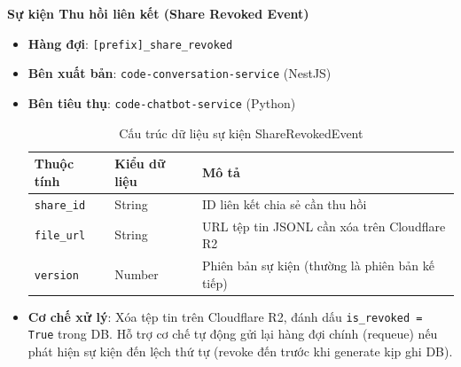 \textbf{Sự kiện Thu hồi liên kết (Share Revoked Event)}
\begin{itemize}
\item \textbf{Hàng đợi}: \texttt{[prefix]\_share\_revoked}
\item \textbf{Bên xuất bản}: \texttt{code-conversation-service} (NestJS)
\item \textbf{Bên tiêu thụ}: \texttt{code-chatbot-service} (Python)

\begin{table}[H]
\centering
\begin{tabular}{|l|l|l|}
\hline
\textbf{Thuộc tính} & \textbf{Kiểu dữ liệu} & \textbf{Mô tả} \\ \hline
\texttt{share\_id} & String & ID liên kết chia sẻ cần thu hồi \\ \hline
\texttt{file\_url} & String & URL tệp tin JSONL cần xóa trên Cloudflare R2 \\ \hline
\texttt{version} & Number & Phiên bản sự kiện (thường là phiên bản kế tiếp) \\ \hline
\end{tabular}
\caption{Cấu trúc dữ liệu sự kiện ShareRevokedEvent}
\end{table}

\item \textbf{Cơ chế xử lý}: Xóa tệp tin trên Cloudflare R2, đánh dấu \texttt{is\_revoked = True} trong DB. Hỗ trợ cơ chế tự động gửi lại hàng đợi chính (requeue) nếu phát hiện sự kiện đến lệch thứ tự (revoke đến trước khi generate kịp ghi DB).
\end{itemize}

